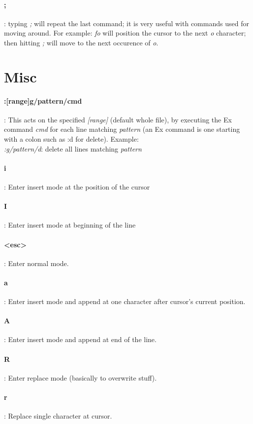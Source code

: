 \documentclass[10pt,letterpaper]{book}
\begin{document}
\paragraph{;}: typing \textit{;} will repeat the last command; it is very useful with commands used for moving around. For example: \textit{fo} will position the cursor to the next \textit{o} character; then hitting \textit{;} will move to the next occurence of \textit{o}.

\section{Misc}
\paragraph{:[range]g/pattern/cmd}: This acts on the specified \textit{[range]} (default whole file), by executing the Ex command \textit{cmd} for each line matching \textit{pattern} (an Ex command is one starting with a colon such as :d for delete). Example:\\
\textit{:g/pattern/d}: delete all lines matching \textit{pattern}\\
\paragraph{i}: Enter insert mode at the position of the cursor
\paragraph{I}: Enter insert mode at beginning of the line
\paragraph{<esc>}: Enter normal mode.
\paragraph{a}: Enter insert mode and append at one character after cursor's current position.
\paragraph{A}: Enter insert mode and append at end of the line.
\paragraph{R}: Enter replace mode (basically to overwrite stuff).
\paragraph{r}: Replace single character at cursor.
\end{document}

